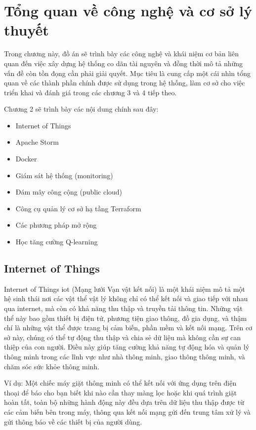 \chapter{Tổng quan về công nghệ và cơ sở lý thuyết}

Trong chương này, đồ án sẽ trình bày các công nghệ và khái niệm cơ bản liên quan đến việc xây dựng hệ thống co dãn tài nguyên và đồng thời mô tả những vấn đề còn tồn đọng cần phải giải quyết. Mục tiêu là cung cấp một cái nhìn tổng quan về các thành phần chính được sử dụng trong hệ thống, làm cơ sở cho việc triển khai và đánh giá trong các chương 3 và 4 tiếp theo.

Chương 2 sẽ trình bày các nội dung chính sau đây:
\begin{itemize}
    \item Internet of Things
    \item Apache Storm
    \item Docker
    \item Giám sát hệ thống (monitoring)
    \item Đám mây công cộng (public cloud)
    \item Công cụ quản lý cơ sở hạ tầng Terraform
    \item Các phương pháp mở rộng
    \item Học tăng cường Q-learning
\end{itemize}

\section{Internet of Things}

Internet of Things \gls{iot} (Mạng lưới Vạn vật kết nối) là một khái niệm mô tả một hệ sinh thái nơi các vật thể vật lý không chỉ có thể kết nối và giao tiếp với nhau qua internet, mà còn có khả năng thu thập và truyền tải thông tin. Những vật thể này bao gồm thiết bị điện tử, phương tiện giao thông, đồ gia dụng, và thậm chí là những vật thể được trang bị cảm biến, phần mềm và kết nối mạng. Trên cơ sở này, chúng có thể tự động thu thập và chia sẻ dữ liệu mà không cần sự can thiệp của con người. Điều này giúp tăng cường khả năng tự động hóa và quản lý thông minh trong các lĩnh vực như nhà thông minh, giao thông thông minh, và chăm sóc sức khỏe thông minh.

Ví dụ: Một chiếc máy giặt thông minh có thể kết nối với ứng dụng trên điện thoại để báo cho bạn biết khi nào cần thay màng lọc hoặc khi quá trình giặt hoàn tất, toàn bộ những hành động này đều dựa trên dữ liệu thu thập được từ các cảm biến bên trong máy, thông qua kết nối mạng gửi đến trung tâm xử lý và gửi thông báo về các thiết bị của người dùng.

